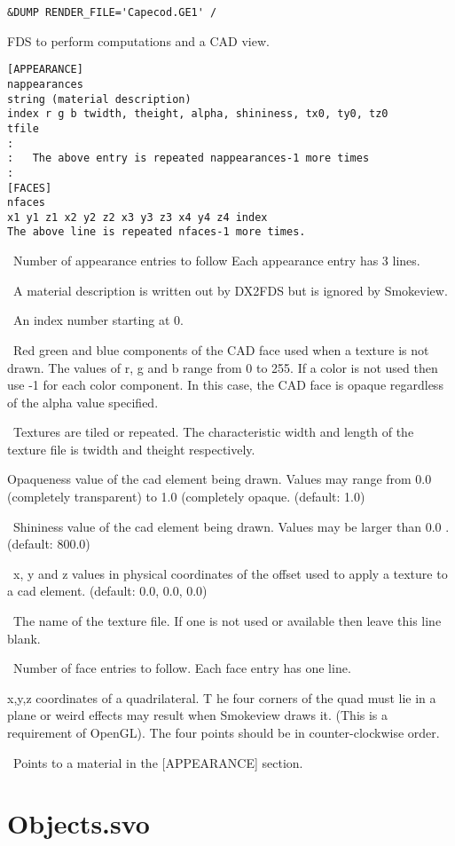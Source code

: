 \documentclass[11pt,twoside]{book}
\newcommand{\parma}{.75}
\newcommand{\parmb}{.5}
\newcommand{\parmc}{0.25}
\newcommand{\blist}{
\begin{list}
{}{
\setlength{\leftmargin}{\parma in}
\setlength{\labelwidth}{\parmb in}
\setlength{\labelsep}{\parmc in}
\setlength{\listparindent}{0.3in}
\setlength{\topsep}{.3in}
\setlength{\parsep}{.0in}
}}
\newcommand{\elist}{\end{list}}
\newcommand{\hitem}[1]{\item[{\bf #1} \hfill]}
\begin{document}
\begin{lstlisting}
&DUMP RENDER_FILE='Capecod.GE1' /
\end{lstlisting}

FDS to perform computations and a CAD view.


\begin{lstlisting}
[APPEARANCE]
nappearances
string (material description)
index r g b twidth, theight, alpha, shininess, tx0, ty0, tz0
tfile
:
:   The above entry is repeated nappearances-1 more times
:
[FACES]
nfaces
x1 y1 z1 x2 y2 z2 x3 y3 z3 x4 y4 z4 index
The above line is repeated nfaces-1 more times.
\end{lstlisting}

\blist

\hitem{nappearances}\ Number of appearance entries to follow
Each appearance entry has 3 lines.
\hitem{string}\ A material description is written out by DX2FDS but is ignored by Smokeview.
\hitem{index}\ An index number starting at 0.
\hitem{r, g, b}\ Red green and blue components of the CAD face used when a texture is not drawn.
The values of r, g and b range from 0 to 255.  If a color is not used
then use -1 for each color component.  In this case, the CAD face is opaque regardless of the alpha value specified.
\hitem{twidth, theight}\ Textures are tiled or repeated.
The characteristic width and length of the
texture file is twidth and theight respectively.
\hitem{alpha}Opaqueness value of the cad element being drawn.
Values may range from 0.0 (completely transparent)
to 1.0 (completely opaque.  (default: 1.0)
\hitem{shininess}\ Shininess value of the cad element being drawn.
Values may be larger than 0.0 .  (default: 800.0)
\hitem{tx0, ty0, tz0}\ x, y and z values in physical coordinates of the offset used to apply a
texture to a cad element. (default: 0.0, 0.0, 0.0)
\hitem{tfile}\ The name of the texture file.  If one is not used or
available then leave this line blank.
\hitem{nfaces}\ Number of face entries to follow.  Each face entry has one line.
\hitem{x1/y1/z1/.../x4/y4/z4}x,y,z coordinates of a quadrilateral.  T
he four corners of the quad
must lie in a plane or weird effects may result when Smokeview draws it.
(This is a requirement
of OpenGL).  The four points should be in counter-clockwise order.
\hitem{index}\ Points to a material in the [APPEARANCE] section.
\elist

\section{Objects.svo}
\label{section:objects}

\end{document}
